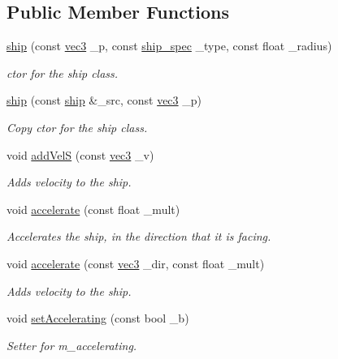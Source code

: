 \subsection*{Public Member Functions}
\begin{DoxyCompactItemize}
\item 
\hyperlink{classship_a3ca9f0f5ecbed6a53d7bae37b8e57704}{ship} (const \hyperlink{structvec3}{vec3} \-\_\-p, const \hyperlink{ship_8hpp_af74a63841701826d661cb9809aaf7092}{ship\-\_\-spec} \-\_\-type, const float \-\_\-radius)
\begin{DoxyCompactList}\small\item\em ctor for the ship class. \end{DoxyCompactList}\item 
\hyperlink{classship_a2d79339fb680dce8b7b581103706c357}{ship} (const \hyperlink{classship}{ship} \&\-\_\-src, const \hyperlink{structvec3}{vec3} \-\_\-p)
\begin{DoxyCompactList}\small\item\em Copy ctor for the ship class. \end{DoxyCompactList}\item 
void \hyperlink{classship_a9c6d721f86324e034dd0c97deb903257}{add\-Vel\-S} (const \hyperlink{structvec3}{vec3} \-\_\-v)
\begin{DoxyCompactList}\small\item\em Adds velocity to the ship. \end{DoxyCompactList}\item 
void \hyperlink{classship_ac6075d376a2f10087a7daddd6dc4104e}{accelerate} (const float \-\_\-mult)
\begin{DoxyCompactList}\small\item\em Accelerates the ship, in the direction that it is facing. \end{DoxyCompactList}\item 
void \hyperlink{classship_a8ea8250d5797b7b3822997eca7059b6d}{accelerate} (const \hyperlink{structvec3}{vec3} \-\_\-dir, const float \-\_\-mult)
\begin{DoxyCompactList}\small\item\em Adds velocity to the ship. \end{DoxyCompactList}\item 
void \hyperlink{classship_a940069471464086ac4a47089c4ee7c1f}{set\-Accelerating} (const bool \-\_\-b)
\begin{DoxyCompactList}\small\item\em Setter for m\-\_\-accelerating. \end{DoxyCompactList}\item 

\end{DoxyCompactItemize}
